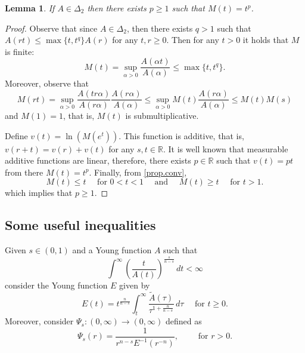 \documentclass[12pt,reqno]{amsart}
\newtheorem{lem}[thm]{Lemma}
\theoremstyle{definition}
\theoremstyle{remark}
\numberwithin{equation}{section}
\begin{document}
\begin{lem}
If $A\in \Delta_2$ then there exists $p\geq 1$ such that $M(t)=t^p$.
\end{lem}
\begin{proof}
Observe that since $A\in \Delta_2$, then there exists $q>1$ such that $A(r t)\leq \max\{t,t^q\} A(r)$ for any $t,r\geq 0$. Then for any $t>0$ it holds that $M$ is finite:
$$
M(t)=\sup_{\alpha>0} \frac{A(\alpha t)}{A(\alpha)} \leq \max\{t,t^{q}\}.
$$
Moreover, observe that
$$
M(rt)=
\sup_{\alpha>0} \frac{A(t r\alpha )}{A(r\alpha)} \frac{A(r\alpha)}{A(\alpha)} \leq 
\sup_{\alpha>0} M(t) \frac{A(r\alpha)}{A(\alpha)} \leq M(t)M(s)
$$
and $M(1)=1$, that is, $M(t)$ is submultiplicative.

Define $v(t)=\ln(M(e^t))$. This function is additive, that is, $v(r+t)=v(r)+v(t)$ for any $s,t\in\mathbb{R}$. It is well known that measurable additive functions are linear, therefore, there exists $p\in \mathbb{R}$ such that $v(t)=pt$ from there $M(t)=t^p$. Finally, from \eqref{prop.conv}, 
\begin{equation*} 
M(t) \leq t\quad  \text{ for } 0<t<1 \quad \text{ and } \quad M(t)\geq t\quad  \text{ for } t>1.
\end{equation*}
which implies that $p\geq 1$. 
\end{proof}


\subsection{Some useful inequalities}
Given $s\in(0,1)$ and a Young function $A$ such that
\begin{equation} \label{cond1}
\int^\infty \left(\frac{t}{A(t)}\right)^\frac{s}{n-s}\,dt<\infty
\end{equation}
consider the Young function $E$ given by
\begin{equation} \label{func.e}
E(t)=t^\frac{n}{n-s}\int_t^\infty \frac{\tilde A(\tau)}{\tau^{1+\frac{n}{n-s}}}\,d\tau\quad \text{ for } t\geq 0.
\end{equation}
Moreover, consider $\Psi_s\colon (0,\infty)\to (0,\infty)$ defined as
$$
\Psi_s(r)=\frac{1}{r^{n-s} E^{-1}(r^{-n})}, \qquad \text{ for } r>0.
$$
 
\end{document}
